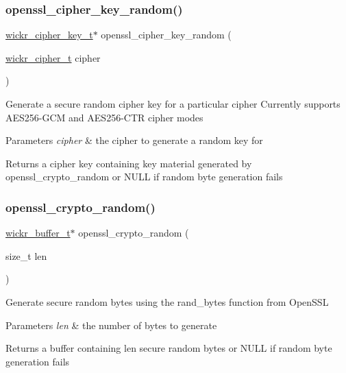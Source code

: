 \subsubsection{\texorpdfstring{openssl\_cipher\_key\_random()}{openssl\_cipher\_key\_random()}}
{\footnotesize\ttfamily \mbox{\hyperlink{structwickr__cipher__key}{wickr\+\_\+cipher\+\_\+key\+\_\+t}}$\ast$ openssl\+\_\+cipher\+\_\+key\+\_\+random (\begin{DoxyParamCaption}\item[{\mbox{\hyperlink{structwickr__cipher}{wickr\+\_\+cipher\+\_\+t}}}]{cipher }\end{DoxyParamCaption})}

Generate a secure random cipher key for a particular cipher Currently supports A\+E\+S256-\/\+G\+CM and A\+E\+S256-\/\+C\+TR cipher modes


\begin{DoxyParams}{Parameters}
{\em cipher} & the cipher to generate a random key for \\
\hline
\end{DoxyParams}
\begin{DoxyReturn}{Returns}
a cipher key containing key material generated by \textquotesingle{}openssl\+\_\+crypto\+\_\+random\textquotesingle{} or N\+U\+LL if random byte generation fails 
\end{DoxyReturn}
\mbox{\label{group__openssl__crypto_gadfe740d19f9f2096b818553e90dae0d7}} 
\subsubsection{\texorpdfstring{openssl\_crypto\_random()}{openssl\_crypto\_random()}}
{\footnotesize\ttfamily \mbox{\hyperlink{structwickr__buffer}{wickr\+\_\+buffer\+\_\+t}}$\ast$ openssl\+\_\+crypto\+\_\+random (\begin{DoxyParamCaption}\item[{size\+\_\+t}]{len }\end{DoxyParamCaption})}

Generate secure random bytes using the rand\+\_\+bytes function from Open\+S\+SL


\begin{DoxyParams}{Parameters}
{\em len} & the number of bytes to generate \\
\hline
\end{DoxyParams}
\begin{DoxyReturn}{Returns}
a buffer containing \textquotesingle{}len\textquotesingle{} secure random bytes or N\+U\+LL if random byte generation fails 
\end{DoxyReturn}
\mbox{\label{group__openssl__crypto_gaf1faa509e06c188acfbdf43e2197c61a}} 
